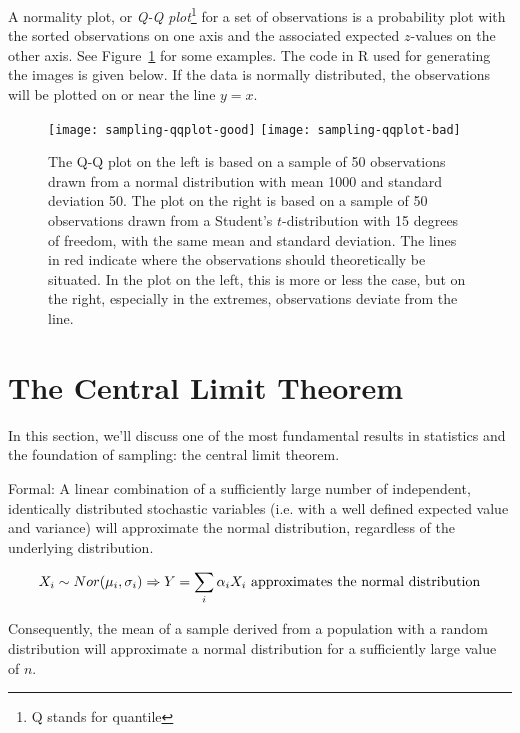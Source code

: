 \begin{definition}
    \label{def:qq-plot}
    A normality plot, or \emph{Q-Q plot}\footnote{Q stands for quantile} for a set of observations is a probability plot with the sorted observations on one axis and the associated expected $z$-values on the other axis. See Figure~\ref{fig:qqplot} for some examples. The code in R used for generating the images is given below. If the data is normally distributed, the observations will be plotted on or near the line $y = x$.
  \end{definition}

\begin{figure}
  \begin{center}
    \texttt{[image: sampling-qqplot-good]}
    \texttt{[image: sampling-qqplot-bad]}
  \end{center}
  \caption{The Q-Q plot on the left is based on a sample of 50 observations drawn from a normal distribution with mean 1000 and standard deviation 50. The plot on the right is based on a sample of 50 observations drawn from a Student's $t$-distribution with 15 degrees of freedom, with the same mean and standard deviation. The lines in red indicate where the observations should theoretically be situated. In the plot on the left, this is more or less the case, but on the right, especially in the extremes, observations deviate from the line.}
  \label{fig:qqplot}
\end{figure}



\section{The Central Limit Theorem}
\label{sec:central-limit-theorem}

In this section, we'll discuss one of the most fundamental results in statistics and the foundation of sampling: the central limit theorem.

\begin{definition}
  Formal: A linear combination of a sufficiently large number of independent, identically distributed stochastic variables (i.e. with a well defined expected value and variance) will approximate the normal distribution, regardless of the underlying distribution.

  \[X_{i} \sim Nor(\mu_{i}, \sigma_{i}) \Rightarrow Y = \sum_{i} \alpha_{i} X_{i} \textnormal{ approximates the normal distribution} \]

  Consequently, the mean of a sample derived from a population with a random distribution will approximate a normal distribution for a sufficiently large value of $n$.
\end{definition}

